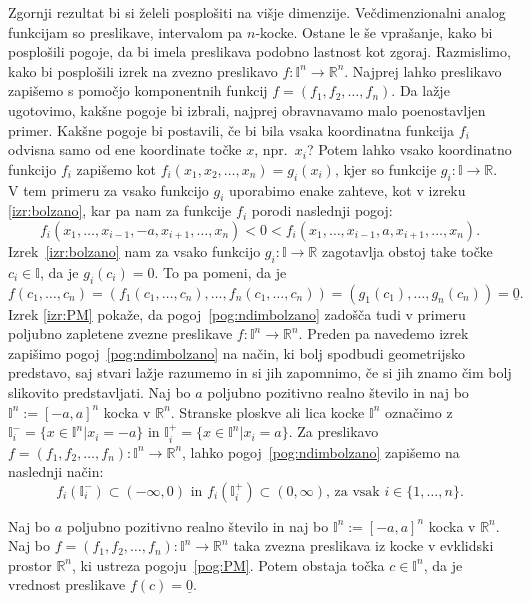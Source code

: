 \documentclass[mat1]{fmfdelo}
\newcommand{\R}{\mathbb R}
\newcommand{\I}{\mathbb I}
\newcommand{\0}{\underline{0}}
\begin{document}
Zgornji rezultat bi si želeli posplošiti na višje dimenzije. Večdimenzionalni analog funkcijam so preslikave, intervalom pa $n$-kocke. Ostane le še vprašanje, kako bi posplošili pogoje, da bi imela preslikava podobno lastnost kot zgoraj. Razmislimo, kako bi posplošili izrek na zvezno preslikavo $f : \I^n \to \R^n$. Najprej lahko preslikavo zapišemo s pomočjo komponentnih funkcij $f = (f_1, f_2, \dots, f_n)$. Da lažje ugotovimo, kakšne pogoje bi izbrali, najprej obravnavamo malo poenostavljen primer. Kakšne pogoje bi postavili, če bi bila vsaka koordinatna funkcija $f_i$ odvisna samo od ene koordinate točke $x$, npr.\ $x_i$? Potem lahko vsako koordinatno funkcijo $f_i$ zapišemo kot $f_i(x_1, x_2, \dots, x_n) = g_i(x_i)$, kjer so funkcije $g_i : \I \to \R$. V tem primeru za vsako funkcijo $g_i$ uporabimo enake zahteve, kot v izreku \ref{izr:bolzano}, kar pa nam za funkcije $f_i$ porodi naslednji pogoj: 
\begin{equation}\label{pog:ndimbolzano}
f_i(x_1, \dots, x_{i-1}, -a, x_{i+1}, \dots, x_n) < 0 < f_i(x_1, \dots, x_{i-1}, a, x_{i+1}, \dots, x_n).
\end{equation}
Izrek~\ref{izr:bolzano} nam za vsako funkcijo $g_i : \I \to \R$ zagotavlja obstoj take točke $c_i \in \I$, da je $g_i(c_i) = 0$. To pa pomeni, da je
$$f(c_1, \dots, c_n) = (f_1(c_1, \dots, c_n), \dots, f_n(c_1, \dots, c_n)) = (g_1(c_1), \dots, g_n(c_n)) = \0.$$
Izrek \ref{izr:PM} pokaže, da pogoj~\eqref{pog:ndimbolzano} zadošča tudi v primeru poljubno zapletene zvezne preslikave $f : \I^n \to \R^n$. Preden pa navedemo izrek zapišimo pogoj~\eqref{pog:ndimbolzano} na način, ki bolj spodbudi geometrijsko predstavo, saj stvari lažje razumemo in si jih zapomnimo, če si jih znamo čim bolj slikovito predstavljati.
Naj bo $a$ poljubno pozitivno realno število in naj bo $\I^n := [-a, a]^n$ kocka v $\R^n$. Stranske ploskve ali lica kocke $\I^n$ označimo z $\I_i^- = \{x\in \I^n | x_i = -a\}$ in $\I_i^+ = \{x\in \I^n | x_i = a\}.$ Za preslikavo $f = (f_1, f_2, \dots, f_n) : \I^n \to \R^n$, lahko pogoj~\eqref{pog:ndimbolzano} zapišemo na naslednji način:
\begin{equation}\label{pog:PM}
f_i(\I_i^-) \subset (- \infty, 0)  \text{ in } f_i(\I_i^+) \subset (0, \infty) \text{, za vsak } i \in  \{1, \dots, n\}.
\end{equation}
\begin{izrek}\label{izr:PM}
Naj bo $a$ poljubno pozitivno realno število in naj bo $\I^n := [-a, a]^n$ kocka v $\R^n$. Naj bo $f = (f_1, f_2, \dots, f_n) : \I^n  \to \R^n$ taka zvezna preslikava iz kocke v evklidski prostor $\R^n$, ki ustreza pogoju~\eqref{pog:PM}. Potem obstaja točka $c \in \I^n$, da je vrednost preslikave $f(c) = \0$.
\end{izrek}
\end{document}
